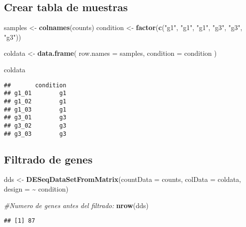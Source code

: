 \documentclass[
]{article}
\newenvironment{Shaded}{\begin{snugshade}}{\end{snugshade}}
\newcommand{\AttributeTok}[1]{\textcolor[rgb]{0.13,0.29,0.53}{#1}}
\newcommand{\CommentTok}[1]{\textcolor[rgb]{0.56,0.35,0.01}{\textit{#1}}}
\newcommand{\FunctionTok}[1]{\textcolor[rgb]{0.13,0.29,0.53}{\textbf{#1}}}
\newcommand{\NormalTok}[1]{#1}
\newcommand{\OtherTok}[1]{\textcolor[rgb]{0.56,0.35,0.01}{#1}}
\newcommand{\SpecialCharTok}[1]{\textcolor[rgb]{0.81,0.36,0.00}{\textbf{#1}}}
\newcommand{\StringTok}[1]{\textcolor[rgb]{0.31,0.60,0.02}{#1}}
\begin{document}
\subsection{Crear tabla de muestras}\label{crear-tabla-de-muestras}

\begin{Shaded}
\begin{Highlighting}[]
\NormalTok{samples }\OtherTok{\textless{}{-}} \FunctionTok{colnames}\NormalTok{(counts)}
\NormalTok{condition }\OtherTok{\textless{}{-}} \FunctionTok{factor}\NormalTok{(}\FunctionTok{c}\NormalTok{(}\StringTok{"g1"}\NormalTok{, }\StringTok{"g1"}\NormalTok{, }\StringTok{"g1"}\NormalTok{, }\StringTok{"g3"}\NormalTok{, }\StringTok{"g3"}\NormalTok{, }\StringTok{"g3"}\NormalTok{))}

\NormalTok{coldata }\OtherTok{\textless{}{-}} \FunctionTok{data.frame}\NormalTok{(}
  \AttributeTok{row.names =}\NormalTok{ samples,}
  \AttributeTok{condition =}\NormalTok{ condition}
\NormalTok{)}

\NormalTok{coldata}
\end{Highlighting}
\end{Shaded}

\begin{verbatim}
##       condition
## g1_01        g1
## g1_02        g1
## g1_03        g1
## g3_01        g3
## g3_02        g3
## g3_03        g3
\end{verbatim}

\subsection{Filtrado de genes}\label{filtrado-de-genes}

\begin{Shaded}
\begin{Highlighting}[]
\NormalTok{dds }\OtherTok{\textless{}{-}} \FunctionTok{DESeqDataSetFromMatrix}\NormalTok{(}\AttributeTok{countData =}\NormalTok{ counts,}
                              \AttributeTok{colData =}\NormalTok{ coldata,}
                              \AttributeTok{design =} \SpecialCharTok{\textasciitilde{}}\NormalTok{ condition)}

\CommentTok{\#Numero de genes antes del filtrado:}
\FunctionTok{nrow}\NormalTok{(dds)}
\end{Highlighting}
\end{Shaded}

\begin{verbatim}
## [1] 87
\end{verbatim}
\end{document}
